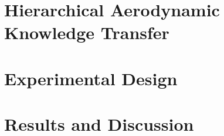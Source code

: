 \documentclass[journal]{new-aiaa}
\begin{document}
\section{Hierarchical Aerodynamic Knowledge Transfer}
\label{sec:methodology}




















\section{Experimental Design}
\label{sec:experimental-design}

















\section{Results and Discussion}
\label{sec:results-and-discussion}


\end{document}
